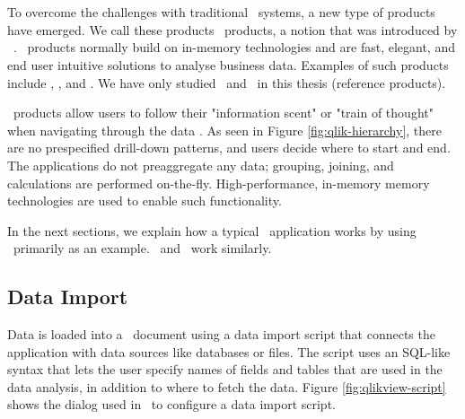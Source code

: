 \section{\bd}
\label{sec:Business Discovery}
To overcome the challenges with traditional \bi~systems, a new type of products have emerged. We call these products \bd~products, a notion that was introduced by \qlikview~\cite{Qlik2014-vd}. \bd~products normally build on in-memory technologies and are fast, elegant, and end user intuitive solutions to analyse business data. Examples of such products include \powerpivot, \tableau, and \qlikview. We have only studied \qlikview~and \tableau~in this thesis (reference products). 


\bd~products allow users to follow their "information scent" or "train of thought" when navigating through the data \cite{Kamkolkar2015-iq, Qlik2014-vd}. As seen in Figure \ref{fig:qlik-hierarchy}, there are no prespecified drill-down patterns, and users decide where to start and end. The applications do not preaggregate any data; grouping, joining, and calculations are performed on-the-fly. High-performance, in-memory memory technologies are used to enable such functionality.

In the next sections, we explain how a typical \bd~application works by using \qlikview~primarily as an example. \tableau~and \powerpivot~work similarly.

\subsection{Data Import}
\label{sub:Data Import}


Data is loaded into a \qlikview~document using a data import script that connects the application with data sources like databases or files. The script uses an SQL-like syntax that lets the user specify names of fields and tables that are used in the data analysis, in addition to where to fetch the data.  Figure \ref{fig:qlikview-script} shows the dialog used in \qlikview~to configure a data import script.

